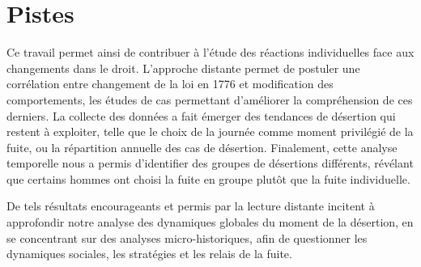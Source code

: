 \documentclass[final, fra]{anthology-ch}     %
\begin{document}
\section{Pistes}
Ce travail permet ainsi de contribuer à l'étude des réactions individuelles face aux changements dans le droit. L'approche distante permet de postuler une corrélation entre changement de la loi en 1776 et modification des comportements, les études de cas permettant d'améliorer la compréhension de ces derniers. La collecte des données a fait émerger des tendances de désertion qui restent à exploiter, telle que le choix de la journée comme moment privilégié de la fuite, ou la répartition annuelle des cas de désertion.
Finalement, cette analyse temporelle nous a permis d'identifier des groupes de désertions différents, révélant que certains hommes ont choisi la fuite en groupe plutôt que la fuite individuelle. 

De tels résultats encourageants et permis par la lecture distante incitent à approfondir notre analyse des dynamiques globales du moment de la désertion, en se concentrant sur des analyses micro-historiques, afin de questionner les dynamiques sociales, les stratégies et les relais de la fuite.  %
\end{document}
